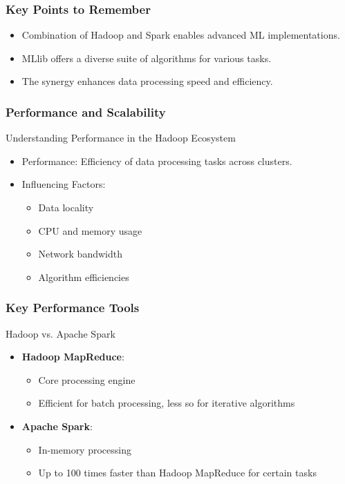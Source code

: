 \documentclass[aspectratio=169]{beamer}
\begin{document}
\begin{frame}[fragile]
    \frametitle{Key Points to Remember}
    \begin{itemize}
        \item Combination of Hadoop and Spark enables advanced ML implementations.
        \item MLlib offers a diverse suite of algorithms for various tasks.
        \item The synergy enhances data processing speed and efficiency.
    \end{itemize}
\end{frame}

\begin{frame}
    \frametitle{Performance and Scalability}
    \begin{block}{Understanding Performance in the Hadoop Ecosystem}
        \begin{itemize}
            \item Performance: Efficiency of data processing tasks across clusters.
            \item Influencing Factors:
                \begin{itemize}
                    \item Data locality
                    \item CPU and memory usage
                    \item Network bandwidth
                    \item Algorithm efficiencies
                \end{itemize}
        \end{itemize}
    \end{block}
\end{frame}

\begin{frame}
    \frametitle{Key Performance Tools}
    \begin{block}{Hadoop vs. Apache Spark}
        \begin{itemize}
            \item \textbf{Hadoop MapReduce}:
                \begin{itemize}
                    \item Core processing engine
                    \item Efficient for batch processing, less so for iterative algorithms
                \end{itemize}
            \item \textbf{Apache Spark}:
                \begin{itemize}
                    \item In-memory processing
                    \item Up to 100 times faster than Hadoop MapReduce for certain tasks
                \end{itemize}
        \end{itemize}
    \end{block}
\end{frame}
\end{document}
